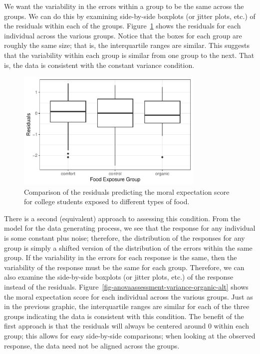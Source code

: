\documentclass[
  letterpaper,
  DIV=11,
  numbers=noendperiod]{scrreprt}
\theoremstyle{plain}
\theoremstyle{definition}
\theoremstyle{definition}
\theoremstyle{remark}
\begin{document}
We want the variability in the errors within a group to be the same
across the groups. We can do this by examining side-by-side boxplots (or
jitter plots, etc.) of the residuals within each of the groups.
Figure~\ref{fig-anovaassessment-variance-organic} shows the residuals
for each individual across the various groups. Notice that the boxes for
each group are roughly the same size; that is, the interquartile ranges
are similar. This suggests that the variability within each group is
similar from one group to the next. That is, the data is consistent with
the constant variance condition.

\begin{figure}

{\centering \includegraphics[width=0.8\textwidth,height=\textheight]{./images/fig-anovaassessment-variance-organic-1.pdf}

}

\caption{\label{fig-anovaassessment-variance-organic}Comparison of the
residuals predicting the moral expectation score for college students
exposed to different types of food.}

\end{figure}

There is a second (equivalent) approach to assessing this condition.
From the model for the data generating process, we see that the response
for any individual is some constant plus noise; therefore, the
distribution of the responses for any group is simply a shifted version
of the distribution of the errors within the same group. If the
variability in the errors for each response is the same, then the
variability of the response must be the same for each group. Therefore,
we can also examine the side-by-side boxplots (or jitter plots, etc.) of
the response instead of the residuals.
Figure~\ref{fig-anovaassessment-variance-organic-alt} shows the moral
expectation score for each individual across the various groups. Just as
in the previous graphic, the interquartile ranges are similar for each
of the three groups indicating the data is consistent with this
condition. The benefit of the first approach is that the residuals will
always be centered around 0 within each group; this allows for easy
side-by-side comparisons; when looking at the observed response, the
data need not be aligned across the groups.
\end{document}
